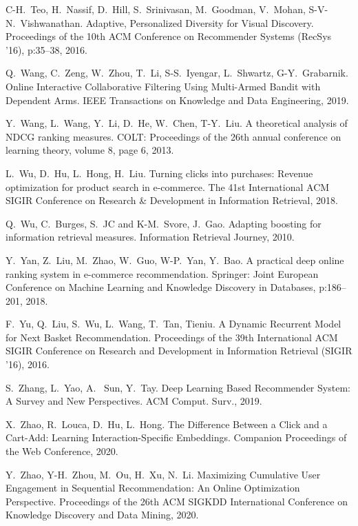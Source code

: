 \documentclass[11pt, dvipdfmx]{article}
\begin{document}
\begin{thebibliography}{10}
\begin{small}
C-H.~Teo, H.~Nassif, D.~Hill, S.~Srinivasan, M.~Goodman, V.~Mohan, S-V-N.~Vishwanathan.
\newblock Adaptive, Personalized Diversity for Visual Discovery.
\newblock Proceedings of the 10th ACM Conference on Recommender Systems (RecSys '16), p:35–38, 2016.

 Q.~Wang, C.~Zeng, W.~Zhou, T.~Li, S-S.~Iyengar, L.~Shwartz, G-Y.~Grabarnik.
\newblock Online Interactive Collaborative Filtering Using Multi-Armed Bandit with Dependent Arms.
\newblock IEEE Transactions on Knowledge and Data Engineering, 2019.

 Y.~Wang, L.~Wang, Y.~Li, D.~He, W.~Chen, T-Y.~Liu.
\newblock A theoretical analysis of NDCG ranking measures.
\newblock COLT: Proceedings of the 26th annual conference on learning theory, volume 8, page 6, 2013.

 L.~Wu, D.~Hu, L.~Hong, H.~Liu. \newblock Turning clicks into purchases: Revenue optimization for product search in e-commerce. \newblock The 41st International ACM SIGIR Conference on Research \& Development in Information Retrieval, 2018.

 Q.~Wu, C.~Burges, S.~JC and K-M.~Svore, J.~Gao.
\newblock Adapting boosting for information retrieval measures.
\newblock Information Retrieval Journey, 2010.

 Y.~Yan, Z.~Liu, M.~Zhao, W.~Guo, W-P.~Yan, Y.~Bao.
\newblock A practical deep online ranking system in e-commerce recommendation.
\newblock Springer: Joint European Conference on Machine Learning and Knowledge Discovery in Databases, p:186--201, 2018.

 F.~Yu, Q.~Liu, S.~Wu, L.~Wang, T.~Tan, Tieniu.
\newblock A Dynamic Recurrent Model for Next Basket Recommendation.
\newblock Proceedings of the 39th International ACM SIGIR Conference on Research and Development in Information Retrieval (SIGIR ’16), 2016.

 S.~Zhang, L.~Yao, A.~ Sun, Y.~Tay.
\newblock Deep Learning Based Recommender System: A Survey and New Perspectives.
\newblock ACM Comput. Surv., 2019.

 X.~Zhao, R.~Louca, D.~Hu, L.~Hong. \newblock The Difference Between a Click and a Cart-Add: Learning Interaction-Specific Embeddings. \newblock Companion Proceedings of the Web Conference, 2020.

 Y.~Zhao, Y-H.~Zhou, M.~Ou, H.~Xu, N.~Li. \newblock Maximizing Cumulative User Engagement in Sequential Recommendation: An Online Optimization Perspective. \newblock Proceedings of the 26th ACM SIGKDD International Conference on Knowledge Discovery and Data Mining, 2020. 

\end{small}
\end{thebibliography}
\end{document}
